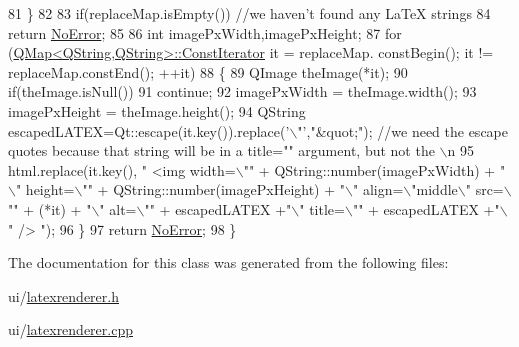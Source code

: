 \begin{DoxyCode}
81     \}
82     
83     \textcolor{keywordflow}{if}(replaceMap.isEmpty()) \textcolor{comment}{//we haven't found any LaTeX strings}
84         \textcolor{keywordflow}{return} \hyperlink{classGuiUtils_1_1LatexRenderer_a2cdeccb3a8a7b62e3f78d029ac05d49ba6f7b1049b057be642910dc794d9893b2}{NoError};
85     
86     \textcolor{keywordtype}{int} imagePxWidth,imagePxHeight;
87     \textcolor{keywordflow}{for} (\hyperlink{classQMap}{QMap<QString,QString>::ConstIterator} it = replaceMap.
      constBegin(); it != replaceMap.constEnd(); ++it)
88     \{
89         QImage theImage(*it);
90         \textcolor{keywordflow}{if}(theImage.isNull())
91             \textcolor{keywordflow}{continue};
92         imagePxWidth = theImage.width();
93         imagePxHeight = theImage.height();
94         QString escapedLATEX=Qt::escape(it.key()).replace(\textcolor{charliteral}{'\(\backslash\)"'},\textcolor{stringliteral}{"&quot;"});  \textcolor{comment}{//we need  the escape quotes
       because that string will be in a title="" argument, but not the \(\backslash\)n}
95         html.replace(it.key(), \textcolor{stringliteral}{" <img width=\(\backslash\)""} + QString::number(imagePxWidth) + \textcolor{stringliteral}{"\(\backslash\)" height=\(\backslash\)""} + 
      QString::number(imagePxHeight) + \textcolor{stringliteral}{"\(\backslash\)" align=\(\backslash\)"middle\(\backslash\)" src=\(\backslash\)""} + (*it) + \textcolor{stringliteral}{"\(\backslash\)"  alt=\(\backslash\)""} + escapedLATEX +\textcolor{stringliteral}{"\(\backslash\)" title=\(\backslash\)""} +
       escapedLATEX +\textcolor{stringliteral}{"\(\backslash\)"  /> "});
96     \}
97     \textcolor{keywordflow}{return} \hyperlink{classGuiUtils_1_1LatexRenderer_a2cdeccb3a8a7b62e3f78d029ac05d49ba6f7b1049b057be642910dc794d9893b2}{NoError};
98 \}
\end{DoxyCode}


The documentation for this class was generated from the following files\+:\begin{DoxyCompactItemize}
\item 
ui/\hyperlink{latexrenderer_8h}{latexrenderer.\+h}\item 
ui/\hyperlink{latexrenderer_8cpp}{latexrenderer.\+cpp}\end{DoxyCompactItemize}
